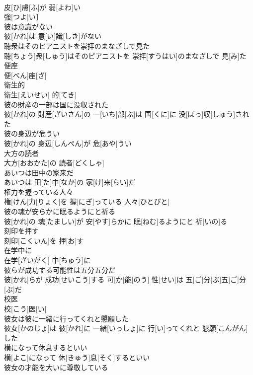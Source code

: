 \documentclass[8pt]{extreport}
\begin{document}
\begin{CJK}{UTF8}{min}
\\	皮[ひ]膚[ふ]が 弱[よわ]い
\\	強[つよ]い］
\\	彼は意識がない	
\\	彼[かれ]は 意[い]識[しき]がない
\\	聴衆はそのピアニストを崇拝のまなざしで見た	
\\	聴[ちょう]衆[しゅう]はそのピアニストを 崇拝[すうはい]のまなざしで 見[み]た
\\	便座	
\\	便[べん]座[ざ]
\\	衛生的	
\\	衛生[えいせい] 的[てき]
\\	彼の財産の一部は国に没収された	
\\	彼[かれ]の 財産[ざいさん]の 一[いち]部[ぶ]は 国[くに]に 没[ぼっ]収[しゅう]された
\\	彼の身辺が危うい	
\\	彼[かれ]の 身辺[しんぺん]が 危[あや]うい
\\	大方の読者	
\\	大方[おおかた]の 読者[どくしゃ]
\\	あいつは田中の家来だ	
\\	あいつは 田[た]中[なか]の 家[け]来[らい]だ
\\	権力を握っている人々	
\\	権[けん]力[りょく]を 握[にぎ]っている 人々[ひとびと]
\\	彼の魂が安らかに眠るようにと祈る	
\\	彼[かれ]の 魂[たましい]が 安[やす]らかに 眠[ねむ]るようにと 祈[いの]る
\\	刻印を押す	
\\	刻印[こくいん]を 押[お]す
\\	在学中に	
\\	在学[ざいがく] 中[ちゅう]に
\\	彼らが成功する可能性は五分五分だ	
\\	彼[かれ]らが 成功[せいこう]する 可[か]能[のう] 性[せい]は 五[ご]分[ぶ]五[ご]分[ぶ]だ
\\	校医	
\\	校[こう]医[い]
\\	彼女は彼に一緒に行ってくれと懇願した	
\\	彼女[かのじょ]は 彼[かれ]に 一緒[いっしょ]に 行[い]ってくれと 懇願[こんがん]した
\\	横になって休息するといい	
\\	横[よこ]になって 休[きゅう]息[そく]するといい
\\	彼女の才能を大いに尊敬している	

\end{CJK}
\end{document}
